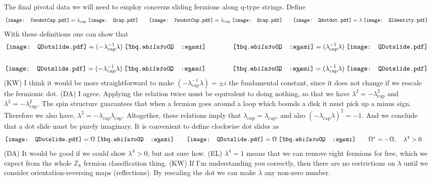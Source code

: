 \documentclass[12pt,a4paper]{article}
\newcommand{\zz}{\mathbb{Z}}
\newcommand{\kw}[1]{{\color{kwcolor}\footnotesize{(KW) #1}}}
\newcommand{\dave}[1]{{\color{ao(english)}\footnotesize{(DA) #1}}}
\newcommand{\ethan}[1]{{\color{amethyst}\footnotesize{(EL) #1}}}
\newcommand{\Qcap}{\mathord{\vcenter{\hbox{\texttt{[image: Qcap.pdf]}}}}}
\newcommand{\Qcup}{\mathord{\vcenter{\hbox{\texttt{[image: Qcap.pdf]}}}}}
\newcommand{\Qdotdot}{\mathord{\vcenter{\hbox{\texttt{[image: Qdotdot.pdf]}}}}}
\newcommand{\QIdentity}{\mathord{\vcenter{\hbox{\texttt{[image: QIdentity.pdf]}}}}}
\newcommand{\QCapDotL}{\mathord{\vcenter{\hbox{\texttt{[image: QDotslide.pdf]}}}}}
\newcommand{\QCupDotR}{\mathord{\vcenter{\hbox{\texttt{[image: QDotslide.pdf]}}}}}
\newcommand{\QCapDotR}{\mathord{\vcenter{\hbox{\reflectbox{\texttt{[image: QDotslide.pdf]}}}}}}
\newcommand{\QCupDotL}{\mathord{\vcenter{\hbox{\reflectbox{\texttt{[image: QDotslide.pdf]}}}}}}
\newcommand{\TwodotCap}{\mathord{\vcenter{\hbox{\texttt{[image: TwodotCap.pdf]}}}}}
\newcommand{\TwodotCup}{\mathord{\vcenter{\hbox{\texttt{[image: TwodotCup.pdf]}}}}}
\begin{document}
The final pivotal data we will need to employ concerns sliding fermions along q-type strings. 
Define 
\begin{align}
\TwodotCap =  \lambda_{\text{cap}} \; \Qcap \quad \quad
\TwodotCup =  \lambda_{\text{cup}}\; \Qcup \quad \quad
\Qdotdot =  \lambda \; \QIdentity
\end{align}
With these definitions one can show that
\begin{align}
\QCapDotL =(-\lambda_{\text{cap}}^{-1} \lambda )\; \QCapDotR \qquad \qquad \QCapDotR  = (\lambda_{\text{cap}}^{-1} \lambda ) \; \QCapDotL\\ 
\\
\QCupDotR= (-\lambda_{\text{cup}}^{-1} \lambda )\; \QCupDotL \qquad \qquad \QCupDotL  = (\lambda_{\text{cup}}^{-1} \lambda) \; \QCupDotR
\end{align}
\kw{I think it would be more straightforward to make $(-\lambda_{\text{cap}}^{-1} \lambda ) = \pm i$ the fundamental constant,
since it does not change if we rescale the fermionic dot.}
\dave{I agree.}
Applying the relation twice must be equivalent to doing nothing, so that we have $\lambda^2 = -\lambda_{\text{cap}}^2$ and $\lambda^2 = -\lambda_{\text{cup}}^2$.
The spin structure guarantees that when a fermion goes around a loop which bounds a disk it must pick up a minus sign. 
Therefore we also have, $\lambda^2 = -\lambda_{\text{cap}} \lambda_{\text{cup}}$.
Altogether, these relations imply that $\lambda_{\text{cup}} = \lambda_{\text{cap}}$, and also $(-\lambda_{\text{cap}} \lambda)^2 = -1$.
And we conclude that a dot slide must be purely imaginary. It is convenient to define clockwise dot slides as
\begin{align}
&\QCapDotL =\Omega \; \QCapDotR \quad \quad \QCupDotR= \Omega \; \QCupDotL \quad \quad \Omega^* = -\Omega, \quad \lambda^4 >0
\end{align}
\dave{It would be good if we could show $\lambda^4>0$, but not sure how.} \ethan{$\lambda^4=1$ means that we can remove eight fermions for free, which we expect from the whole $\zz_8$ fermion classification thing.}
\kw{If I'm understanding you correctly, then there are no restrictions on $\lambda$ until we consider orientation-reversing maps (reflections).
By rescaling the dot we can make $\lambda$ any non-zero number.}
\end{document}
